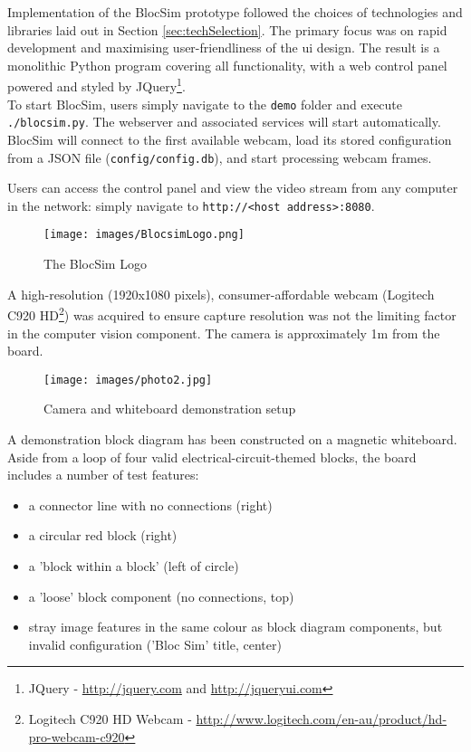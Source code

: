 Implementation of the BlocSim prototype followed the choices of technologies and libraries laid out in Section \ref{sec:techSelection}. The primary focus was on rapid development and maximising user-friendliness of the \gls{ui} design. The result is a monolithic Python program covering all functionality, with a web control panel powered and styled by JQuery\footnote{JQuery - \url{http://jquery.com} and \url{http://jqueryui.com}}.
\\

To start BlocSim, users simply navigate to the \texttt{demo} folder and execute \texttt{./blocsim.py}. The webserver and associated services will start automatically. BlocSim will connect to the first available webcam, load its stored configuration from a JSON file (\texttt{config/config.db}), and start processing webcam frames.
\\

\newpage

Users can access the control panel and view the video stream from any computer in the network: simply navigate to \texttt{http://<host address>:8080}.

\begin{figure}[ht!]
\centering
\texttt{[image: images/BlocsimLogo.png]}
\caption{The BlocSim Logo \cite{blocsim}}
\label{im:blocsimlogo}
\end{figure}

\vspace{0.5 cm}

A high-resolution (1920x1080 pixels), consumer-affordable webcam (Logitech C920 HD\footnote{Logitech C920 HD Webcam - \url{http://www.logitech.com/en-au/product/hd-pro-webcam-c920}}) was acquired to ensure capture resolution was not the limiting factor in the computer vision component. The camera is approximately 1m from the board.

\begin{figure}[ht!]
\centering
\texttt{[image: images/photo2.jpg]}
\caption{Camera and whiteboard demonstration setup}
\label{im:hardware1}
\end{figure}

\clearpage

A demonstration block diagram has been constructed on a magnetic whiteboard. Aside from a loop of four valid electrical-circuit-themed blocks, the board includes a number of test features:
\begin{itemize}
\item a connector line with no connections (right)
\item a circular red block (right)
\item a 'block within a block' (left of circle)
\item a 'loose' block component (no connections, top)
\item stray image features in the same colour as block diagram components, but invalid configuration ('Bloc Sim' title, center)
\end{itemize}

